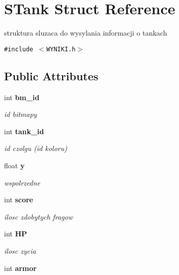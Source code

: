 \section{STank Struct Reference}
\label{struct_s_tank}
struktura sluzaca do wysylania informacji o tankach  


{\tt \#include $<$WYNIKI.h$>$}

\subsection*{Public Attributes}
\begin{CompactItemize}
\item 
int {\bf bm\_\-id}\label{struct_s_tank_b4d7f6b081473187f6cb0f41612ff068}

\begin{CompactList}\small\item\em id bitmapy \item\end{CompactList}\item 
int {\bf tank\_\-id}\label{struct_s_tank_30d8148e33d4138018d55071f7edd985}

\begin{CompactList}\small\item\em id czolgu (id koloru) \item\end{CompactList}\item 
float {\bf y}\label{struct_s_tank_69ba9d6297e97857e25e49004a59c007}

\begin{CompactList}\small\item\em wspolrzedne \item\end{CompactList}\item 
int {\bf score}\label{struct_s_tank_8201f47124e25d4e0aac5f7350c62ac1}

\begin{CompactList}\small\item\em ilosc zdobytych fragow \item\end{CompactList}\item 
int {\bf HP}\label{struct_s_tank_dbc17baddff7dd031be4157085148d41}

\begin{CompactList}\small\item\em ilosc zycia \item\end{CompactList}\item 
int {\bf armor}\label{struct_s_tank_1faaf413911ccaef783deb9639a39a51}


\end{CompactItemize}
